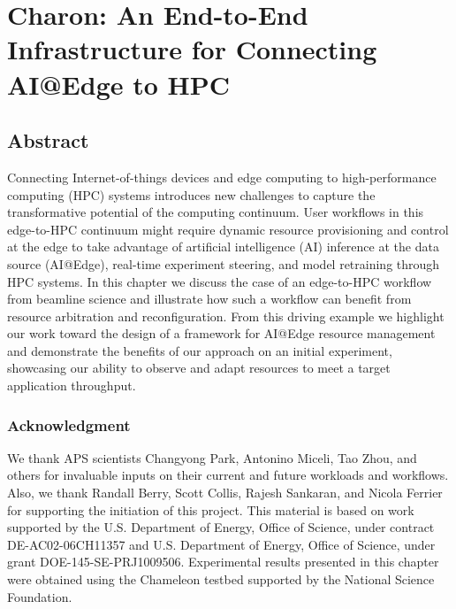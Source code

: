 

\chapter{Charon: An End-to-End Infrastructure for Connecting AI@Edge to HPC} \label{CH3_Charon}

\graphicspath{{Papers/Charon/}}

\section*{Abstract}
Connecting Internet-of-things devices and edge computing to high-performance computing
(HPC) systems introduces new challenges to capture the transformative potential of
the computing continuum. User workflows in this edge-to-HPC continuum might require
dynamic resource provisioning and control at the edge to take advantage of artificial
intelligence (AI) inference at the data source (AI@Edge), real-time experiment
steering, and model retraining through HPC systems. In this chapter we discuss
the case of an edge-to-HPC workflow from beamline science and illustrate how
such a workflow can benefit from resource arbitration and reconfiguration. From
this driving example we highlight our work toward the design of a framework for
AI@Edge resource management and demonstrate the benefits of our approach on an
initial experiment, showcasing our ability to observe and adapt resources to meet
a target application throughput.













\subsection*{Acknowledgment}
We thank APS scientists Changyong Park, Antonino Miceli, Tao Zhou, and others for
invaluable inputs on their current and future workloads and workflows. Also, we
thank Randall Berry, Scott Collis, Rajesh Sankaran, and Nicola Ferrier for
supporting the initiation of this project. This material is based on work
supported by the U.S. Department of Energy, Office of Science, under contract
DE-AC02-06CH11357 and U.S. Department of Energy, Office of Science, under grant
DOE-145-SE-PRJ1009506. Experimental results presented in this chapter were
obtained using the Chameleon testbed supported by the National Science Foundation.
